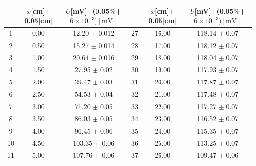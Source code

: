 \documentclass[a4paper]{article}
\begin{document}
\begin{table}[htbp]
	\centering
	\begin{tabular}{ccc||ccc}
		\hline
		   & $x$[cm]$\pm$0.05[cm] & $U$[mV]$\pm$(0.05$\%$+$6 \times 10^{-3})[\text{mV}]$ &    & $x$[cm]$\pm$0.05[cm] & $U$[mV]$\pm$(0.05$\%$+$6 \times 10^{-3})[\text{mV}]$ \\
		\hline
		1  & 0.00                 & 12.20 $\pm$ 0.012                                    & 27 & 16.00                & 118.14 $\pm$ 0.07                                    \\
		2  & 0.50                 & 15.27 $\pm$ 0.014                                    & 28 & 17.00                & 118.12 $\pm$ 0.07                                    \\
		3  & 1.00                 & 20.64 $\pm$ 0.016                                    & 29 & 18.00                & 118.04 $\pm$ 0.07                                    \\
		4  & 1.50                 & 27.95 $\pm$ 0.02                                     & 30 & 19.00                & 117.93 $\pm$ 0.07                                    \\
		5  & 2.00                 & 39.47 $\pm$ 0.03                                     & 31 & 20.00                & 117.87 $\pm$ 0.07                                    \\
		6  & 2.50                 & 54.53 $\pm$ 0.04                                     & 32 & 21.00                & 117.48 $\pm$ 0.07                                    \\
		7  & 3.00                 & 71.20 $\pm$ 0.05                                     & 33 & 22.00                & 117.27 $\pm$ 0.07                                    \\
		8  & 3.50                 & 86.03 $\pm$ 0.05                                     & 34 & 23.00                & 116.52 $\pm$ 0.07                                    \\
		9  & 4.00                 & 96.45 $\pm$ 0.06                                     & 35 & 24.00                & 115.35 $\pm$ 0.07                                    \\
		10 & 4.50                 & 103.35 $\pm$ 0.06                                    & 36 & 25.00                & 113.25 $\pm$ 0.07                                    \\
		11 & 5.00                 & 107.76 $\pm$ 0.06                                    & 37 & 26.00                & 109.47 $\pm$ 0.06                                    \\

\end{tabular}
\end{table}
\end{document}
